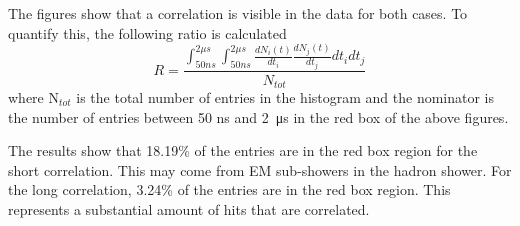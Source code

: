 The figures show that a correlation is visible in the data for both cases. To quantify this, the following ratio is calculated
\begin{equation}\label{eq:CorrelCalcul}
	R = \frac{\int_{50 ns}^{2 \mu s} \int_{50 ns}^{2 \mu s} \frac{dN_i(t)}{dt_i} \frac{dN_j(t)}{dt_j} dt_i dt_j}{N_{tot}}
\end{equation}
where N$_{tot}$ is the total number of entries in the histogram and the nominator is the number of entries between 50 ns and \SI{2}{\micro\second} in the red box of the above figures.

The results show that 18.19\% of the entries are in the red box region for the short correlation. This may come from EM sub-showers in the hadron shower. For the long correlation, 3.24\% of the entries are in the red box region. This represents a substantial amount of hits that are correlated.

